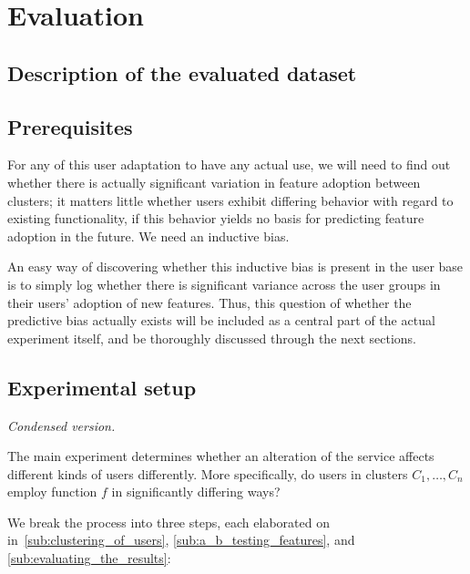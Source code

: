 \chapter{Evaluation}

\label{Chapter4}


\section{Description of the evaluated dataset} %
\label{sec:description_of_the_evaluated_dataset}


\section{Prerequisites} %
\label{sec:prerequisites}

For any of this user adaptation to have any actual use, we will need to find out whether there is actually significant variation in feature adoption between clusters; it matters little whether users exhibit differing behavior with regard to existing functionality, if this behavior yields no basis for predicting feature adoption in the future. We need an inductive bias.

An easy way of discovering whether this inductive bias is present in the user base is to simply log whether there is significant variance across the user groups in their users' adoption of new features. Thus, this question of whether the predictive bias actually exists will be included as a central part of the actual experiment itself, and be thoroughly discussed through the next sections.


\section{Experimental setup} %
\label{sec:experimental_setup}

\emph{Condensed version.}

The main experiment determines whether an alteration of the service affects different kinds of users differently.
More specifically, do users in clusters $C_1, \ldots, C_n$ employ function $f$ in significantly differing ways?

We break the process into three steps, each elaborated on in~\ref{sub:clustering_of_users}, \ref{sub:a_b_testing_features}, and \ref{sub:evaluating_the_results}:

